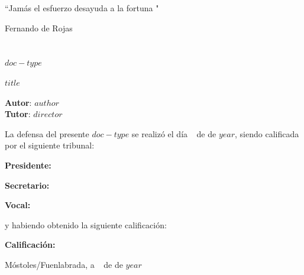\documentclass[$if(fontsize)$$fontsize$$else$11pt$endif$,$if(lang)$$babel-lang$,$endif$a4paper,$for(classoption)$$classoption$$sep$,$endfor$]{$documentclass$}
\begin{document}
\titlepage

\mbox{}
\thispagestyle{empty} %

\epigraph{``Jamás el esfuerzo desayuda a la fortuna "}{\textup{Fernando de Rojas}}


\thispagestyle{empty}
\chapter*{}

\vspace{-4cm}
\begin{center}
\LARGE
\textbf{$doc-type$}

\vspace{1cm}
\large
$title$

\vspace{1cm}
\large
\textbf{Autor}: \space $author$  \\
\textbf{Tutor}: \space $director$

\end{center}

\vspace{1cm}
La defensa del presente $doc-type$ se realizó el día \qquad\(\;\,\) de
\qquad\qquad\qquad\qquad \newline de $year$, siendo calificada por el siguiente tribunal:


\vspace{0.5cm}
\textbf{Presidente:}

\vspace{0.8cm}
\textbf{Secretario:}

\vspace{0.8cm}
\textbf{Vocal:}


\vspace{0.8cm}
y habiendo obtenido la siguiente calificación:

\vspace{0.8cm}
\textbf{Calificación:}


\vspace{0.8cm}
\begin{flushright}
Móstoles/Fuenlabrada, a \qquad\(\;\,\) de \qquad\qquad\qquad\qquad de $year$
\end{flushright}

\end{document}
